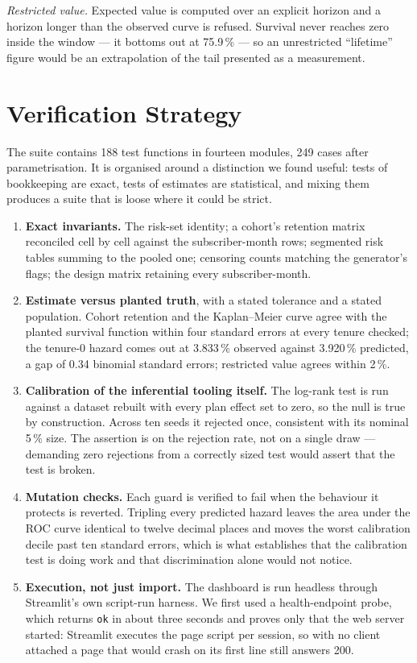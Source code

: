\documentclass[conference]{IEEEtran}
\begin{document}
\emph{Restricted value.} Expected value is computed over an explicit horizon
and a horizon longer than the observed curve is refused. Survival never reaches
zero inside the window --- it bottoms out at 75.9\,\% --- so an unrestricted
``lifetime'' figure would be an extrapolation of the tail presented as a
measurement.

\section{Verification Strategy}

The suite contains 188 test functions in fourteen modules, 249 cases after
parametrisation. It is organised around a distinction we found useful: tests of
bookkeeping are exact, tests of estimates are statistical, and mixing them
produces a suite that is loose where it could be strict.

\begin{enumerate}
\item \textbf{Exact invariants.} The risk-set identity; a cohort's retention
matrix reconciled cell by cell against the subscriber-month rows; segmented
risk tables summing to the pooled one; censoring counts matching the
generator's flags; the design matrix retaining every subscriber-month.
\item \textbf{Estimate versus planted truth}, with a stated tolerance and a
stated population. Cohort retention and the Kaplan--Meier curve agree with the
planted survival function within four standard errors at every tenure checked;
the tenure-0 hazard comes out at 3.833\,\% observed against 3.920\,\%
predicted, a gap of 0.34 binomial standard errors; restricted value agrees
within 2\,\%.
\item \textbf{Calibration of the inferential tooling itself.} The log-rank test
is run against a dataset rebuilt with every plan effect set to zero, so the
null is true by construction. Across ten seeds it rejected once, consistent
with its nominal 5\,\% size. The assertion is on the rejection rate, not on a
single draw --- demanding zero rejections from a correctly sized test would
assert that the test is broken.
\item \textbf{Mutation checks.} Each guard is verified to fail when the
behaviour it protects is reverted. Tripling every predicted hazard leaves the
area under the ROC curve identical to twelve decimal places and moves the worst
calibration decile past ten standard errors, which is what establishes that the
calibration test is doing work and that discrimination alone would not notice.
\item \textbf{Execution, not just import.} The dashboard is run headless
through Streamlit's own script-run harness. We first used a health-endpoint
probe, which returns \texttt{ok} in about three seconds and proves only that
the web server started: Streamlit executes the page script per session, so with
no client attached a page that would crash on its first line still answers 200.
\end{enumerate}
\end{document}
